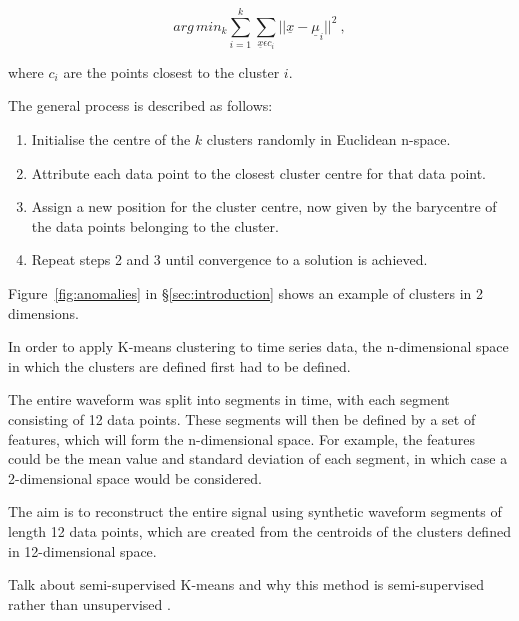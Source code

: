 \begin{equation}
    arg\,min_k \sum_{i=1}^{k} \sum_{\underline{x} \epsilon c_i} ||\underline{x}-\underline{\mu}_i||^2 ~,
    \label{eq:K-means}
\end{equation}

where $c_i$ are the points closest to the cluster $i$.

The general process is described as follows:
\begin{enumerate}
    \item Initialise the centre of the $k$ clusters randomly in Euclidean n-space.
    \item Attribute each data point to the closest cluster centre for that data point. 
    \item Assign a new position for the cluster centre, now given by the barycentre of the data points belonging to the cluster.
    \item Repeat steps 2 and 3 until convergence to a solution is achieved.
\end{enumerate}

Figure~\ref{fig:anomalies} in \S \ref{sec:introduction} shows an example of clusters in 2 dimensions. 

In order to apply K-means clustering to time series data, the n-dimensional space in which the clusters are defined first had to be defined. 

The entire waveform was split into segments in time, with each segment consisting of 12 data points. These segments will then be defined by a set of features, which will form the n-dimensional space. For example, the features could be the mean value and standard deviation of each segment, in which case a 2-dimensional space would be considered. 


The aim is to reconstruct the entire signal using synthetic waveform segments of length 12 data points, which are created from the centroids of the clusters defined in 12-dimensional space. 

Talk about semi-supervised K-means and why this method is semi-supervised rather than unsupervised \cite{596afe3f2b5a4ff3b8f4f9793ad2f4ee}.

